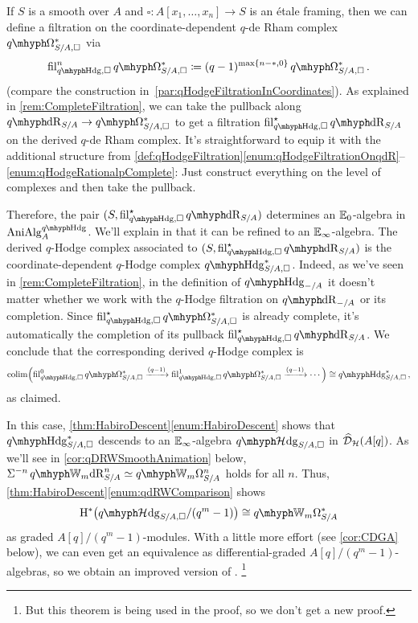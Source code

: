 \documentclass[DIV=12,numbers=enddot,leqno,bibliography=totoc]{scrartcl}
\begin{document}
	\begin{exm}\label{exm:HabiroDescentCoordinateCase}
		If $S$ is a smooth over $A$ and $\square\colon A[x_1,\dotsc,x_n]\rightarrow S$ is an étale framing, then we can define a filtration on the coordinate-dependent $q$-de Rham complex $\qOmega_{S/A, \square}^*$ via
		\begin{equation*}
			\fil_{\qHodge, \square}^n\qOmega_{S/A, \square}^*\coloneqq (q-1)^{\max\{n-*,0\}}\qOmega_{S/A, \square}^*\,.
		\end{equation*}
		(compare the construction in~\cref{par:qHodgeFiltrationInCoordinates}). As explained in \cref{rem:CompleteFiltration}, we can take the pullback along $\qdeRham_{S/A}\rightarrow \qOmega_{S/A, \square}^*$ to get a filtration $\fil_{\qHodge,\square}^\star\qdeRham_{S/A}$ on the derived $q$-de Rham complex. It's straightforward to equip  it with the additional structure from \cref{def:qHodgeFiltration}\cref{enum:qHodgeFiltrationOnqdR}--\cref{enum:qHodgeRationalpComplete}: Just construct everything on the level of complexes and then take the pullback.
		
		Therefore, the pair $(S, \fil_{\qHodge, \square}^\star \qdeRham_{S/A})$ determines an $\mathbb{E}_0$-algebra in $\cat{AniAlg}_A^{\qHodge}$. We'll explain in \cite[Remark~]{qdeRhamku} that it can be refined to an $\mathbb{E}_\infty$-algebra. The derived $q$-Hodge complex associated to $(S, \fil_{\qHodge, \square}^\star \qdeRham_{S/A})$ is the coordinate-dependent $q$-Hodge complex $\qHodge_{S/A, \square}^*$. Indeed, as we've seen in \cref{rem:CompleteFiltration}, in the definition of $\qHodge_{-/A}$ it doesn't matter whether we work with the $q$-Hodge filtration on $\qdeRham_{-/A}$ or its completion. Since $ \fil_{\qHodge, \square}^\star \qOmega_{S/A, \square}^*$ is already complete, it's automatically the completion of its pullback $ \fil_{\qHodge, \square}^\star \qdeRham_{S/A}$. We conclude that the corresponding derived $q$-Hodge complex is
		\begin{equation*}
			\colimit\Bigl( \fil_{\qHodge, \square}^0\qOmega_{S/A, \square}^*\xrightarrow{(q-1)} \fil_{\qHodge, \square}^1\qOmega_{S/A, \square}^*\xrightarrow{(q-1)}\dotsb\Bigr)\cong \qHodge_{S/A, \square}^*\,,
		\end{equation*}
		as claimed.
		
		In this case, \cref{thm:HabiroDescent}\cref{enum:HabiroDescent} shows that $\qHodge_{S/A, \square}^*$ descends to an $\mathbb{E}_\infty$-algebra $\qHhodge_{S/A, \square}$ in $\widehat{\mathcal{D}}_{\mathcal{H}}(A[q])$. As we'll see in \cref{cor:qDRWSmoothAnimation} below, $\Sigma^{-n}\qIW_m\deRham_{S/A}^n\simeq \qIW_m\Omega_{S/A}^n$ holds for all $n$. Thus, \cref{thm:HabiroDescent}\cref{enum:qdRWComparison} shows
		\begin{equation*}
			\H^*\bigl(\qHhodge_{S/A, \square}/(q^m-1)\bigr)\cong \qIW_m\Omega_{S/A}^*
		\end{equation*}
		as graded $A[q]/(q^m-1)$-modules. With a little more effort (see \cref{cor:CDGA} below), we can even get an equivalence as differential-graded $A[q]/(q^m-1)$-algebras, so we obtain an improved version of \cite[Theorem~]{qWitt}.%
		\footnote{But this theorem is being used in the proof, so we don't get a new proof.}
		

\end{exm}
\end{document}
